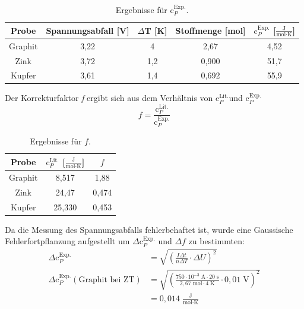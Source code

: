 \documentclass[12pt,a4paper,titlepage,headinclude,bibtotoc]{scrartcl}
\begin{document}
\begin{table}[h!]
\centering
\caption{Ergebnisse für $\text{c}_P^{\text{Exp.}}$.}
\begin{tabular}{c|c|c|c|c}
Probe& Spannungsabfall [V] & $\Delta$T [K]& Stoffmenge [mol] &  $\text{c}_P^{\text{Exp.}}$ [$\frac{\text{J}}{\text{mol}\cdot\text{K}}$]\\
\hline
Graphit & 3,22&4 &2,67 &4,52 \\
\hline
Zink & 3,72 & 1,2&0,900&51,7  \\
\hline
Kupfer & 3,61& 1,4& 0,692 &55,9\\
\end{tabular}
\end{table}
Der Korrekturfaktor \textit{f} ergibt sich aus dem Verhältnis von $\text{c}_P^{\text{Lit.}}$und $\text{c}_P^{\text{Exp.}}$
\begin{equation}
f=\frac{\text{c}_P^{\text{Lit.}}}{\text{c}_P^{\text{Exp.}}}
\end{equation}
\begin{table}[h!]
\centering
\caption{Ergebnisse für $f$.}
\begin{tabular}{c|c|c}
Probe&$\text{c}_P^{\text{Lit.}}$ [$\frac{\text{J}}{\text{mol}\cdot\text{K}}$]&$f$\\
\hline
Graphit &8,517 &1,88 \\
\hline
Zink & 24,47&0,474  \\
\hline
Kupfer & 25,330&0,453\\
\end{tabular}
\end{table}
Da die Messung des Spannungsabfalls fehlerbehaftet ist, wurde eine Gaussische Fehlerfortpflanzung aufgestellt um $\Delta\text{c}_P^{\text{Exp.}}$ und $\Delta f$ zu bestimmten:
\begin{align}
\Delta \text{c}_P^{\text{Exp.}}&=\sqrt{ \left(\frac{I\Delta t}{n\Delta T}\cdot \Delta U \right)^2}\\
\Delta \text{c}_P^{\text{Exp.}}(\text{Graphit bei ZT})&=\sqrt{ \left(\frac{750\cdot 10^{-3}\;\text{A} \cdot 20\;\text{s}}{2,67\;\text{mol}\cdot 4\;\text{K}}\cdot 0,01\;\text{V} \right)^2}\\
&=0,014 \;\frac{\text{J}}{\text{mol}\cdot\text{K}}
\end{align}
\end{document}
